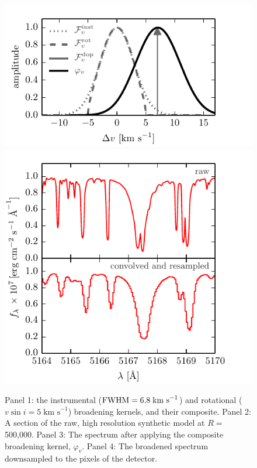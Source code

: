 \documentclass[iop,floatfix]{emulateapj}
\newcommand{\kms}{ \textrm{km s}^{-1} }
\begin{document}
\begin{figure}[!htb]
\begin{center}
  \includegraphics{figs/kernels.pdf}
  \includegraphics{figs/high2low.pdf}
  \caption{Panel 1: the instrumental (${\rm FWHM} =6.8\;\kms$) and rotational ($v \sin i = 5\;\kms$) broadening kernels, and their composite. Panel 2: A section of the raw, high resolution synthetic model at $R=$500,000. Panel 3: The spectrum after applying the composite broadening kernel, $\varphi_v$. Panel 4: The broadened spectrum downsampled to the pixels of the detector.}
\label{fig:broadening}
\end{center}
\end{figure}
\end{document}
